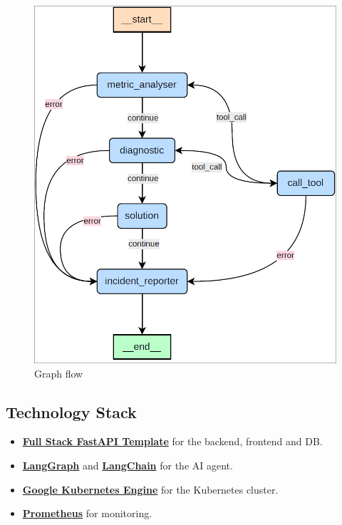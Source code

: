 \documentclass[
]{article}
\providecommand{\tightlist}{%
  \setlength{\itemsep}{0pt}\setlength{\parskip}{0pt}}
\begin{document}
\begin{figure}
\centering
\includegraphics{img/realisation_langgraphworkflow.png}
\caption{Graph flow}
\end{figure}

\hypertarget{technology-stack}{%
\subsection{Technology Stack}\label{technology-stack}}

\begin{itemize}
\tightlist
\item
  \href{https://github.com/tiangolo/full-stack-fastapi-template}{\textbf{Full
  Stack FastAPI Template}} for the backend, frontend and DB.
\item
  \href{https://langchain-ai.github.io/langgraph/}{\textbf{LangGraph}}
  and \href{https://www.langchain.com/}{\textbf{LangChain}} for the AI
  agent.
\item
  \href{https://cloud.google.com/kubernetes-engine}{\textbf{Google
  Kubernetes Engine}} for the Kubernetes cluster.
\item
  \href{https://prometheus.io/}{\textbf{Prometheus}} for monitoring.
\end{itemize}
\end{document}
